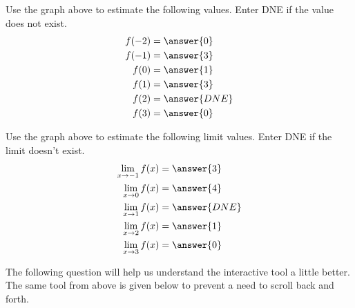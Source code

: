 \documentclass{ximera}
\begin{document}
\begin{exercise}
   	\begin{question} Use the graph above to estimate the following values.  Enter DNE if the value does not exist.
   		\begin{align*}
   			f(-2) &= \answer{0} \\
   			f(-1) &= \answer{3}  \\
   			f(0) &= \answer{1}  \\
   			f(1) &= \answer{3} \\
   			f(2) &= \answer{DNE} \\
   			f(3) &= \answer{0}
   		\end{align*}
   	\end{question}
   	
   	\begin{question} Use the graph above to estimate the following limit values.  Enter DNE if the limit doesn't exist.
   		\begin{align*}
   			\lim\limits_{x \to -1}f(x) &= \answer{3} \\
   			\lim\limits_{x \to 0}f(x) &= \answer{4} \\
   			\lim\limits_{x \to 1}f(x) &= \answer{DNE} \\
   			\lim\limits_{x \to 2}f(x) &= \answer{1} \\
   			\lim\limits_{x \to 3}f(x) &= \answer{0} 
   		\end{align*}
   	\end{question}
   	
   	The following question will help us understand the interactive tool a little better.  The same tool from above is given below to prevent a need to scroll back and forth.
   	
   	\begin{center}
   		\begin{onlineOnly}
   		\end{onlineOnly} 
   	\end{center}
   	

\end{exercise}
\end{document}
